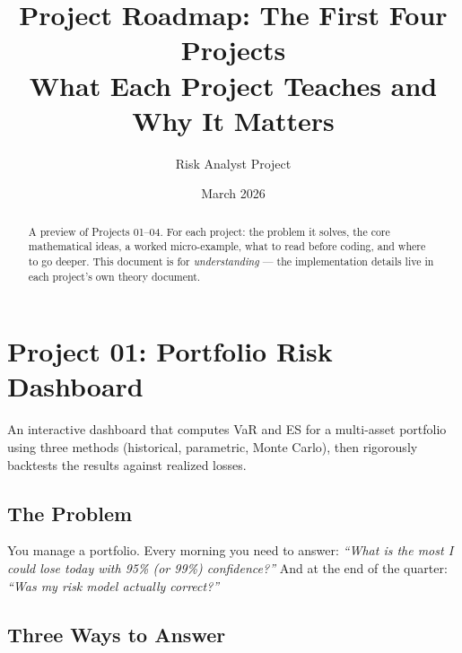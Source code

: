 \documentclass[11pt, a4paper]{article}
\title{%
    \textbf{Project Roadmap: The First Four Projects} \\[0.5em]
    \large What Each Project Teaches and Why It Matters
}
\author{Risk Analyst Project}
\date{March 2026}
\begin{document}
\maketitle

\begin{abstract}
A preview of Projects 01--04.
For each project: the problem it solves, the core mathematical ideas,
a worked micro-example, what to read before coding, and where to go deeper.
This document is for \emph{understanding} --- the implementation details live in each project's own theory document.
\end{abstract}

\tableofcontents
\newpage

\section{Project 01: Portfolio Risk Dashboard}

\begin{objective}
An interactive dashboard that computes VaR and ES for a multi-asset portfolio using three methods (historical, parametric, Monte Carlo), then rigorously backtests the results against realized losses.
\end{objective}

\subsection{The Problem}

You manage a portfolio.
Every morning you need to answer: \emph{``What is the most I could lose today with 95\% (or 99\%) confidence?''}
And at the end of the quarter: \emph{``Was my risk model actually correct?''}

\subsection{Three Ways to Answer}
\end{document}
